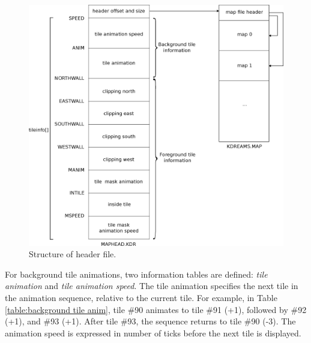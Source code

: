 \documentclass[book.tex]{subfiles}
\begin{document}
\begin{figure}[H]
\centering
 \includegraphics[width=1.0\textwidth]{imgs/drawings/map_header.eps}
 \caption{Structure of  header file.}
 \label{fig:map-header-file}
\end{figure}
\par
For background tile animations, two information tables are defined: \textit{tile animation} and \textit{tile animation speed}. The tile animation specifies the next tile in the animation sequence, relative to the current tile. For example, in Table \ref{table:background tile anim}, tile \#90 animates to tile \#91 (+1), followed by \#92 (+1), and \#93 (+1). After tile \#93, the sequence returns to tile \#90 (-3). The animation speed is expressed in number of ticks before the next tile is displayed. \\
\end{document}
